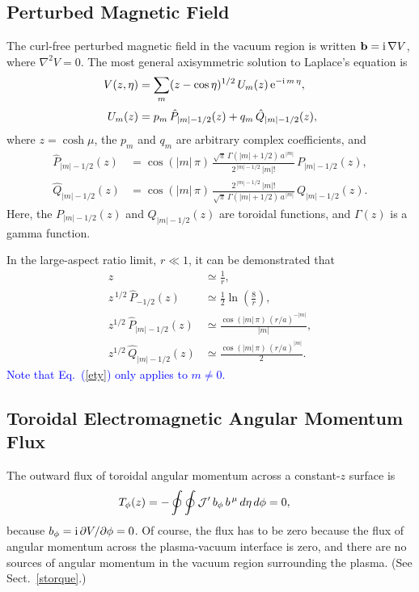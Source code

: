\documentclass[12pt,prb,aps]{revtex4-1}
\begin{document}
\subsection{Perturbed Magnetic Field}
The curl-free perturbed magnetic field in the vacuum region is written ${\bf b} = {\rm i}\,\nabla V$,
where
$\nabla^2 V =0$.
The most general axisymmetric  solution to Laplace's equation is\,\cite{tj1,mf1}
\begin{align}
V(z,\eta)&= \sum_m (z-\cos\eta)^{1/2}\,U_m(z)\,{\rm e}^{-{\rm i}\,m\,\eta}, \\[0.5ex]
U_m(z) &= p_m\,\hat{P}_{|m|-1/2}(z)+q_m\,\hat{Q}_{|m|-1/2}(z),
\end{align}
where  $z=\cosh\mu$, the $p_m$ and $q_m$ are arbitrary complex coefficients, and 
\begin{align}\label{e21dd}
\hat{P}_{|m|-1/2}(z) &= \cos(|m|\,\pi)\,\frac{\sqrt{\pi}\,\Gamma(|m|+1/2)\,a^{\,|m|}}{2^{\,|m|-1/2}\,|m|!}\,P_{|m|-1/2}(z),\\[0.5ex]
\hat{Q}_{|m|-1/2}(z)&= \cos(|m|\,\pi)\,\frac{2^{\,|m|-1/2}\,|m|!}{\sqrt{\pi}\,\Gamma(|m|+1/2)\,a^{\,|m|}}\,Q_{|m|-1/2}(z).\label{e22dd}
\end{align}
Here,  the $P_{|m|-1/2}(z)$  and $Q_{|m|-1/2}(z)$ are toroidal functions,\cite{as1} and $\Gamma(z)$ is a
gamma function.\cite{as2}

In the large-aspect ratio limit, $r\ll 1$, it can be demonstrated that\,\cite{mf2}
\begin{align}
z&\simeq \frac{1}{r},\label{e25t}\\[0.5ex]
z^{\,1/2}\,\hat{P}_{-1/2}(z) &\simeq \frac{1}{2}\ln\left(\frac{8}{r}\right),\\[0.5ex]
z^{1/2}\,\hat{P}_{|m|-1/2}(z) &\simeq \frac{\cos(|m|\,\pi)\,(r/a)^{-|m|}}{|m|},\label{ety}\\[0.5ex]
z^{1/2}\,\hat{Q}_{|m|-1/2}(z) &\simeq \frac{\cos(|m|\,\pi)\,(r/a)^{|m|}}{2}.\label{e29t}
\end{align}
\textcolor{blue}{Note that Eq.~(\ref{ety}) only applies to $m\neq 0$.}

\subsection{Toroidal Electromagnetic Angular Momentum Flux}
The outward flux of toroidal angular momentum across a constant-$z$ surface is\,\cite{tj,tj1}
\begin{align}
T_\phi(z) &= -\oint\oint {\cal J}' \,b_\phi\,b^{\,\mu}\,d\eta\,d\phi = 0,
\end{align}
because $b_\phi = {\rm i}\,\partial V/\partial\phi = 0$. Of course, the flux has to be zero because the flux of angular momentum across the plasma-vacuum
interface is zero, and there are no sources of angular momentum in the vacuum region surrounding the plasma. (See Sect.~\ref{storque}.)
\end{document}
